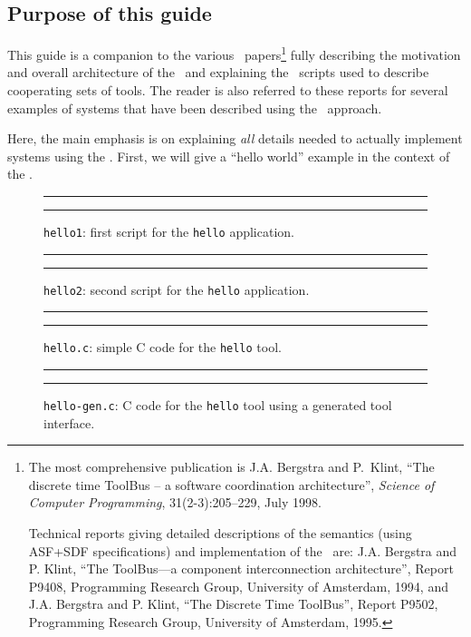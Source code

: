 \documentclass[twoside]{article} %
\begin{document}
\subsection{Purpose of this guide}
This guide is a companion to the various \TB\ papers\footnote{The most comprehensive
publication is J.A. Bergstra and P.~Klint,
``The discrete time {T}ool{B}us -- a software coordination
  architecture'', {\em Science of Computer Programming}, 31(2-3):205--229, July 1998.  

Technical reports giving detailed descriptions of the semantics (using ASF+SDF specifications)
and implementation of the \TB\ are:
J.A. Bergstra and
P. Klint, ``The ToolBus---a component interconnection architecture'',
Report P9408, Programming Research Group, University of Amsterdam,
1994, and J.A. Bergstra and P. Klint, ``The Discrete Time ToolBus'',
Report P9502, Programming Research Group, University of Amsterdam, 1995.}
fully describing the motivation and overall architecture of the
\TB\ and explaining the \T\ scripts used to describe cooperating sets
of tools. The reader is also referred to these reports for several examples
of systems that have been described using the \TB\ approach.

Here, the main  emphasis is on explaining {\em all} details needed to actually
implement systems using the \TB. First, we will give a ``hello world'' example
in the context of the \TB.

\begin{figure}[tb]
\rule{\textwidth}{0.5mm}

  \caption{{\tt hello1}: first script for the {\tt hello} application.}
  \label{fig:hello1.tb}
\rule{\textwidth}{0.5mm}
\end{figure}

\begin{figure}[tb]
\rule{\textwidth}{0.5mm}

  \caption{{\tt hello2}: second script for the {\tt hello} application.}
  \label{fig:hello2.tb}
\rule{\textwidth}{0.5mm}
\end{figure}

\begin{figure}[tb]
\rule{\textwidth}{0.5mm}

  \caption{{\tt hello.c}: simple C code for the {\tt hello} tool.}
  \label{fig:hello.c}
\rule{\textwidth}{0.5mm}
\end{figure}

\begin{figure}[tb]
\rule{\textwidth}{0.5mm}

  \caption{{\tt hello-gen.c}: C code for the {\tt hello} tool using a generated tool interface.}
  \label{fig:hello-gen.c}
\rule{\textwidth}{0.5mm}
\end{figure}
\end{document}
